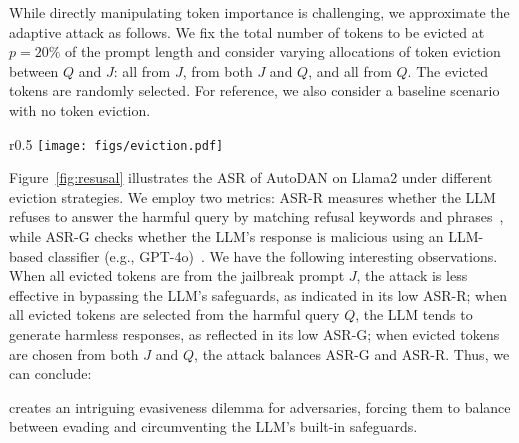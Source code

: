 While directly manipulating token importance is challenging, we approximate the adaptive attack as follows. We fix the total number of tokens to be evicted at $p = 20\%$ of the prompt length and consider varying allocations of token eviction between $Q$ and $J$:
 all from $J$,  from both $J$ and $Q$, and 
all from $Q$. The evicted tokens are randomly selected. For reference, we also consider a baseline scenario with no token eviction. 

\begin{wrapfigure}{r}{0.5\textwidth}
    \centering
\vspace{-15pt}
\texttt{[image: figs/eviction.pdf]}
    \caption{\rkv's response to adaptive attacks that manipulate token importance.}
    \label{fig:resusal}
\vspace{-5pt}
\end{wrapfigure}
Figure~\ref{fig:resusal} illustrates the ASR of AutoDAN on Llama2 under different eviction strategies. We employ two metrics: ASR-R measures whether the LLM refuses to answer the harmful query by matching refusal keywords and phrases~\citep{gcg}, while ASR-G checks whether the LLM's response is malicious using an LLM-based classifier (e.g., GPT-4o)~\citep{cold-attack}. We have the following interesting observations. When all evicted tokens are from the jailbreak prompt $J$, the attack is less effective in bypassing the LLM's safeguards, as indicated in its low ASR-R; when all evicted tokens are selected from the harmful query $Q$, the LLM tends to generate harmless responses, as reflected in its low ASR-G; when evicted tokens are chosen from both $J$ and $Q$, the attack balances ASR-G and ASR-R. Thus, we can conclude:

\begin{mtbox}{}
\rkv creates an intriguing evasiveness dilemma for adversaries, forcing them to balance between evading \rkv and circumventing the LLM's built-in safeguards.
\end{mtbox}





